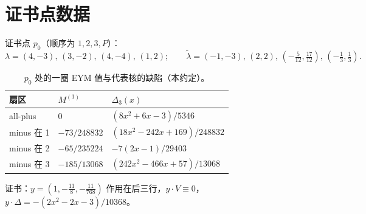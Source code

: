 \documentclass[11pt,a4paper]{ctexart}
\newcommand{\Mone}{M^{(1)}}
\theoremstyle{definition}
\theoremstyle{remark}
\begin{document}
\appendix
\section{证书点数据}\label{app:data}
证书点 $p_0$（顺序为 $1,2,3,P$）：
\[
\lambda=(4,-3),\,(3,-2),\,(4,-4),\,(1,2);\qquad
\tilde\lambda=(-1,-3),\,(2,2),\,(-\tfrac{5}{12},\tfrac{17}{12}),\,(-\tfrac13,\tfrac13).
\]
\begin{table}[h]
\centering\small
\caption{$p_0$ 处的一圈 EYM 值与代表核的缺陷（本约定）。}\label{tab:p0}
\begin{tabular}{@{}lll@{}}
\toprule
扇区 & $\Mone$ & $\Delta_3(x)$ \\ \midrule
all-plus & $0$ & $(8x^2+6x-3)/5346$ \\
minus 在 1 & $-73/248832$ & $(18x^2-242x+169)/248832$ \\
minus 在 2 & $-65/235224$ & $-7(2x-1)/29403$ \\
minus 在 3 & $-185/13068$ & $(242x^2-466x+57)/13068$ \\
\bottomrule
\end{tabular}
\end{table}
证书：$y=(1,-\tfrac{11}{8},-\tfrac{11}{768})$ 作用在后三行，$y\cdot V\equiv0$，$y\cdot\Delta=-(2x^2-2x-3)/10368$。

\FloatBarrier
\end{document}
